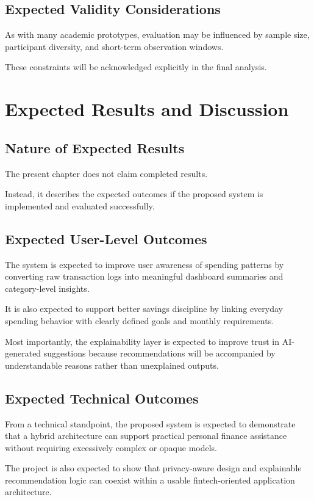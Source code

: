 \documentclass[12pt,a4paper]{report}
\begin{document}
\section{Expected Validity Considerations}
As with many academic prototypes,
evaluation may be influenced by sample size,
participant diversity,
and short-term observation windows.

These constraints will be acknowledged explicitly in the final analysis.

\chapter{Expected Results and Discussion}

\section{Nature of Expected Results}
The present chapter does not claim completed results.

Instead,
it describes the expected outcomes if the proposed system is implemented and evaluated successfully.

\section{Expected User-Level Outcomes}
The system is expected to improve user awareness of spending patterns by converting raw transaction logs into meaningful dashboard summaries and category-level insights.

It is also expected to support better savings discipline by linking everyday spending behavior with clearly defined goals and monthly requirements.

Most importantly,
the explainability layer is expected to improve trust in AI-generated suggestions because recommendations will be accompanied by understandable reasons rather than unexplained outputs.

\section{Expected Technical Outcomes}
From a technical standpoint,
the proposed system is expected to demonstrate that a hybrid architecture can support practical personal finance assistance without requiring excessively complex or opaque models.

The project is also expected to show that privacy-aware design and explainable recommendation logic can coexist within a usable fintech-oriented application architecture.
\end{document}

